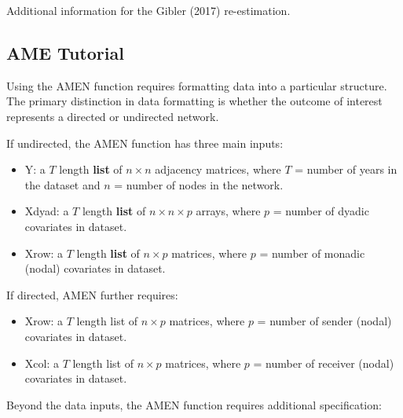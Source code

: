 Additional information for the Gibler (2017) re-estimation. 


\FloatBarrier

\FloatBarrier
\clearpage

\subsection*{AME Tutorial}

Using the AMEN function requires formatting data into a particular structure. The primary distinction in data formatting is whether the outcome of interest represents a directed or undirected network. 

If undirected, the AMEN function has three main inputs:

\begin{itemize}[noitemsep,nolistsep]
    \item Y: a $T$ length \textbf{list} of $n\times n$ adjacency matrices, where $T$ = number of years in the dataset and $n$ = number of nodes in the network.
    \item Xdyad: a $T$ length \textbf{list} of $n\times n\times p$ arrays, where $p$ = number of dyadic covariates in dataset. 
    \item Xrow: a $T$ length \textbf{list} of $n\times p$ matrices, where $p$ = number of monadic (nodal) covariates in dataset. 
\end{itemize}

If directed, AMEN further requires: 

\begin{itemize}[noitemsep,nolistsep]
    \item Xrow: a $T$ length list of $n\times p$ matrices, where $p$ = number of sender (nodal) covariates in dataset. 
    \item Xcol: a $T$ length list of $n\times p$ matrices, where $p$ = number of receiver (nodal) covariates in dataset. 
\end{itemize}

Beyond the data inputs, the AMEN function requires additional specification: 

